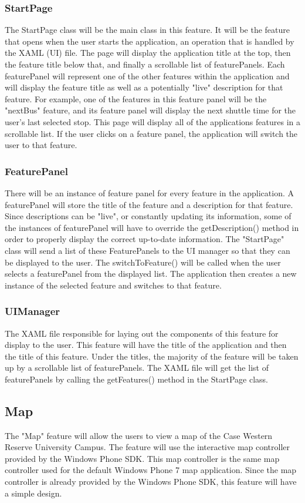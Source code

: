 \documentclass[pdftex,12pt,letter]{article}
\begin{document}
\subsubsection{StartPage}
The StartPage class will be the main class in this feature. It will be the feature that opens when the user starts the application, an operation that is handled by the XAML (UI) file. The page will display the application title at the top, then the feature title below that, and finally a scrollable list of featurePanels. Each featurePanel will represent one of the other features within the application and will display the feature title as well as a potentially "live" description for that feature. For example, one of the features in this feature panel will be the "nextBus" feature, and its feature panel will display the next shuttle time for the user's last selected stop. This page will display all of the applications features in a scrollable list. If the user clicks on a feature panel, the application will switch the user to that feature.
\subsubsection{FeaturePanel}
There will be an instance of feature panel for every feature in the application. A featurePanel will store the title of the feature and a description for that feature. Since descriptions can be "live", or constantly updating its information, some of the instances of featurePanel will have to override the getDescription() method in order to properly display the correct up-to-date information. The "StartPage" class will send a list of these FeaturePanels to the UI manager so that they can be displayed to the user. The switchToFeature() will be called when the user selects a featurePanel from the displayed list. The application then creates a new instance of the selected feature and switches to that feature.
\subsubsection{UIManager}
The XAML file responsible for laying out the components of this feature for display to the user. This feature will have the title of the application and then the title of this feature. Under the titles, the majority of the feature will be taken up by a scrollable list of featurePanels. The XAML file will get the list of featurePanels by calling the getFeatures() method in the StartPage class. 
\subsection{Map}
The "Map" feature will allow the users to view a map of the Case Western Reserve University Campus. The feature will use the interactive map controller provided by the Windows Phone SDK. This map controller is the same map controller used for the default Windows Phone 7 map application. Since the map controller is already provided by the Windows Phone SDK, this feature will have a simple design.
\end{document}
